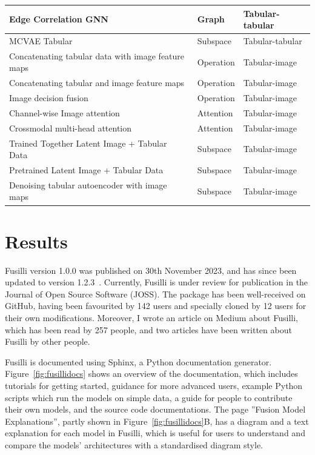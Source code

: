 \begin{table}[!ht]
\begin{tabular}{|p{8cm}ll|}
        Edge Correlation GNN & Graph & Tabular-tabular \\ \hline 
        MCVAE Tabular~\cite{antelmiSparseMultiChannelVariational2019}  & Subspace & Tabular-tabular \\ \hline
        Concatenating tabular data with image feature maps~\cite{liFusingMetadataDermoscopy2020}  & Operation & Tabular-image \\ \hline
        Concatenating tabular and image feature maps~\cite{gaoReducingUncertaintyCancer2022} & Operation & Tabular-image \\ \hline
        Image decision fusion & Operation & Tabular-image \\ \hline 
        Channel-wise Image attention~\cite{duanmuPredictionPathologicalComplete2020} & Attention & Tabular-image \\ \hline
        Crossmodal multi-head attention~\cite{golovanevskyMultimodalAttentionbasedDeep2022} & Attention & Tabular-image \\ \hline
        Trained Together Latent Image + Tabular Data~\cite{zhaoMultimodalDeepLearning2022} & Subspace & Tabular-image \\ \hline
        Pretrained Latent Image + Tabular Data~\cite{zhaoMultimodalDeepLearning2022} & Subspace & Tabular-image \\ \hline
        Denoising tabular autoencoder with image maps~\cite{yanRicherFusionNetwork2021} & Subspace & Tabular-image \\ \hline
    \end{tabular}
\end{table}

\section{Results}

Fusilli version 1.0.0 was published on 30th November 2023, and has since been updated to version 1.2.3~\cite{townendFlorencejtFusilliFusilli2024}.
Currently, Fusilli is under review for publication in the Journal of Open Source Software (JOSS).
The package has been well-received on GitHub, having been favourited by 142 users and specially cloned by 12 users for their own modifications.
Moreover, I wrote an article on Medium about Fusilli, which has been read by 257 people, and two articles have been written about Fusilli by other people.

Fusilli is documented using Sphinx, a Python documentation generator.
Figure~\ref{fig:fusillidocs} shows an overview of the documentation, which includes tutorials for getting started, guidance for more advanced users, example Python scripts which run the models on simple data, a guide for people to contribute their own models, and the source code documentations.
The page ''Fusion Model Explanations'', partly shown in Figure~\ref{fig:fusillidocs}B, has a diagram and a text explanation for each model in Fusilli, which is useful for users to understand and compare the models' architectures with a standardised diagram style.


